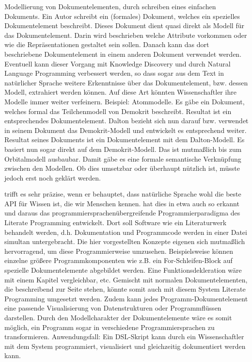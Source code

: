  
Modellierung von Dokumentelementen, durch schreiben eines einfachen Dokuments. Ein Autor schreibt ein (formales) Dokument, welches ein spezielles Dokumentelement beschreibt. Dieses Dokument dient quasi direkt als Modell für das Dokumentelement. Darin wird beschrieben welche Attribute vorkommen oder wie die Repräsentationen gestaltet sein sollen. Danach kann das dort beschriebene Dokumentelement in einem anderen Dokument verwendet werden. Eventuell kann dieser Vorgang mit Knowledge Discovery und durch Natural Language Programming verbessert werden, so dass sogar aus dem Text in natürlicher Sprache weitere Erkenntnisse über das Dokumentelement, bzw. dessen Modell, extrahiert werden können. Auf diese Art könnten Wissenschaftler ihre Modelle immer weiter verfeinern. Beispiel: Atommodelle. Es gäbe ein Dokument, welches formal das Teilchenmodell von Demokrit beschreibt. Resultat ist ein entsprechendes Dokumentelement. Dalton bezieht sich nun darauf bzw. verwendet in seinem Dokument das Demokrit-Modell und entwickelt es entsprechend weiter. Resultat seines Dokuments ist ein Dokumentelement mit dem Dalton-Modell. Es basiert nun sogar direkt auf dem Demokrit-Modell. Das ist mutmaßlich bis zum Orbitalmodell ausbaubar. Damit gäbe es eine formale semantische Verknüpfung zwischen den Modellen. Ob dies umsetzbar oder überhaupt nützlich ist, müsste jedoch erst noch geklärt werden.

 
\citep[S.~3]{Segaran} trifft es sehr präzise, wenn er behauptet, dass natürliche Sprache wohl die beste API für Wissen ist, die wir Menschen kennen. \citep[S.~1]{Knuth} hat dies in etwa auch so erkannt und daraus das programmiersprachenübergreifende Programmierparadigma des Literate Programming entwickelt. Dort soll Software wie ein Literaturwerk behandelt werden, d.h. Dokumentation und Programmcode werden in einer Datei simultan untergebracht. Die hier vorgestellten Konzepte eigenen sich mutmaßlich hervorragend, um diese Programmierweise umzusehen. Beispielsweise können einzelne größere Programmkomponenten wie z.B. ein For-Schleifen-Block auf spezielle Dokumentelemente abgebildet werden. Eine Funktionsdekleration wäre mit einem Kapitel vergleichbar, etc. Gemischt mit normalen Dokumentelementen, die beschreibend zur Seite stehen, könnte somit auch mit diesem System Literate Programming umgesetzt werden. Zudem kann jedes Programm-Dokumentelement eine passende Visualisierung von Datenstrukturen oder Programmflüssen darstellen. Durch den Modellcharakter der Dokumentelemente wäre es somit möglich, ein Programm sogar in verschiedene Programmiersprachen zu transformieren. Anwendungsfall: Ein DSL-Skript kann durch ein Wissenschaftler mit dem System programmiert, visualisiert und gleichzeitig dokumentiert werden kann.

